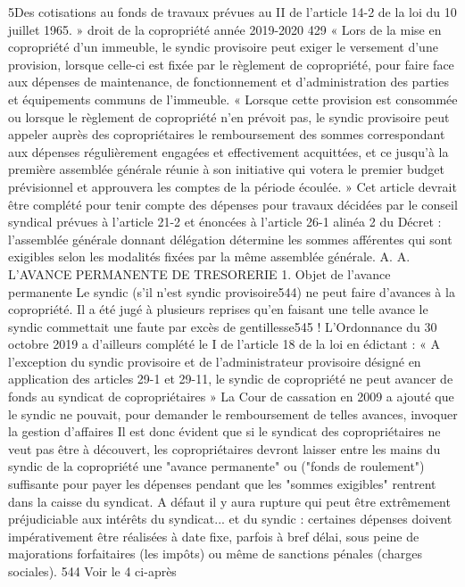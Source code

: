 5\degres Des cotisations au fonds de travaux prévues au II de l’article 14-2 de la loi du 10 juillet 1965.
»
droit de la copropriété année 2019-2020
429
« Lors de la mise en copropriété d’un immeuble, le syndic provisoire peut exiger le versement d’une provision, lorsque celle-ci est fixée par le règlement de copropriété, pour faire face aux dépenses de maintenance, de fonctionnement et d’administration des parties et équipements communs de l’immeuble.
« Lorsque cette provision est consommée ou lorsque le règlement de copropriété n’en prévoit pas, le syndic provisoire peut appeler auprès des copropriétaires le remboursement des sommes correspondant aux dépenses régulièrement engagées et effectivement acquittées, et ce jusqu’à la première assemblée générale réunie à son initiative qui votera le premier budget prévisionnel et approuvera les comptes de la période écoulée. »
Cet article devrait être complété pour tenir compte des dépenses pour travaux décidées par le conseil syndical prévues à l’article 21-2 et énoncées à l’article 26-1 alinéa 2 du Décret : l’assemblée générale donnant délégation détermine les sommes afférentes qui sont exigibles selon les modalités fixées par la même assemblée générale.
A. A. L'AVANCE PERMANENTE DE TRESORERIE
1. Objet de l’avance permanente
Le syndic (s’il n’est syndic provisoire544) ne peut faire d’avances à la copropriété. Il a été jugé à plusieurs reprises qu’en faisant une telle avance le syndic commettait une faute par excès de gentillesse545 !
L’Ordonnance du 30 octobre 2019 a d’ailleurs complété le I de l’article 18 de la loi en édictant : « A l'exception du syndic provisoire et de l'administrateur provisoire désigné en application des articles 29-1 et 29-11, le syndic de copropriété ne peut avancer de fonds au syndicat de copropriétaires »
La Cour de cassation en 2009 a ajouté que le syndic ne pouvait, pour demander le remboursement de telles avances, invoquer la gestion d’affaires
Il est donc évident que si le syndicat des copropriétaires ne veut pas être à découvert, les copropriétaires devront laisser entre les mains du syndic de la copropriété une "avance permanente" ou ("fonds de roulement") suffisante pour payer les dépenses pendant que les "sommes exigibles" rentrent dans la caisse du syndicat.
A défaut il y aura rupture qui peut être extrêmement préjudiciable aux intérêts du syndicat... et du syndic : certaines dépenses doivent impérativement être réalisées à date fixe, parfois à bref délai, sous peine de majorations forfaitaires (les impôts) ou même de sanctions pénales (charges sociales).
544 Voir le 4 ci-après
